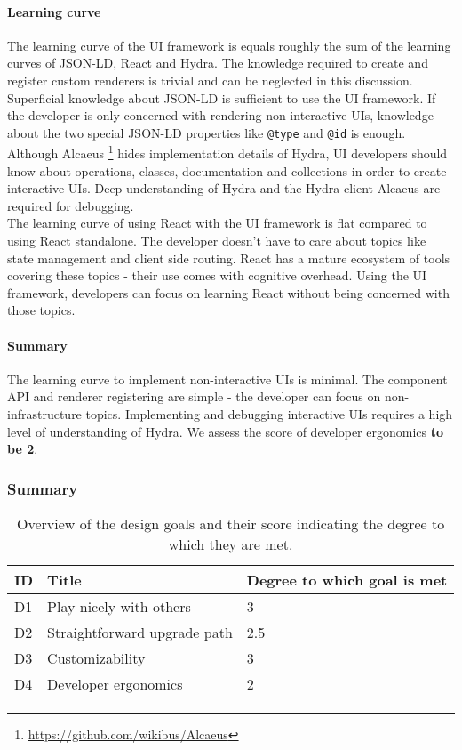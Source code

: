 \paragraph{Learning curve}
The learning curve of the UI framework is equals roughly the sum of the learning curves of JSON-LD, React and Hydra. The knowledge required to create and register custom renderers is trivial and can be neglected in this discussion. \\
Superficial knowledge about JSON-LD is sufficient to use the UI framework. If the developer is only concerned with rendering non-interactive UIs, knowledge about the two special JSON-LD properties like \lstinline{@type} and \lstinline{@id} is enough. \\
Although Alcaeus \footnote{\url{https://github.com/wikibus/Alcaeus}} hides implementation details of Hydra, UI developers should know about operations, classes, documentation and collections in order to create interactive UIs. Deep understanding of Hydra and the Hydra client Alcaeus are required for debugging. \\
The learning curve of using React with the UI framework is flat compared to using React standalone. The developer doesn't have to care about topics like state management and client side routing. React has a mature ecosystem of tools covering these topics - their use comes with cognitive overhead. Using the UI framework, developers can focus on learning React without being concerned with those topics.

\paragraph{Summary}
The learning curve to implement non-interactive UIs is minimal. The component API and renderer registering are simple - the developer can focus on non-infrastructure topics. Implementing and debugging interactive UIs requires a high level of understanding of Hydra. We assess the score of developer ergonomics \textbf{to be 2}.

\subsubsection{Summary}

\begin{table}[!htb]
  \begin{center}
    \begin{tabular}{|l|l|l|}
      \hline
      \textbf{ID} & \textbf{Title} & \textbf{Degree to which goal is met} \\
      \hline
      D1 & Play nicely with others & 3 \\
      \hline
      D2 & Straightforward upgrade path & 2.5 \\
      \hline
      D3 & Customizability & 3 \\
      \hline
      D4 & Developer ergonomics & 2 \\
      \hline
    \end{tabular}
    \caption{Overview of the design goals and their score indicating the degree to which they are met.}
    \label{tab:designgoalscomplexity}
  \end{center}
\end{table}

